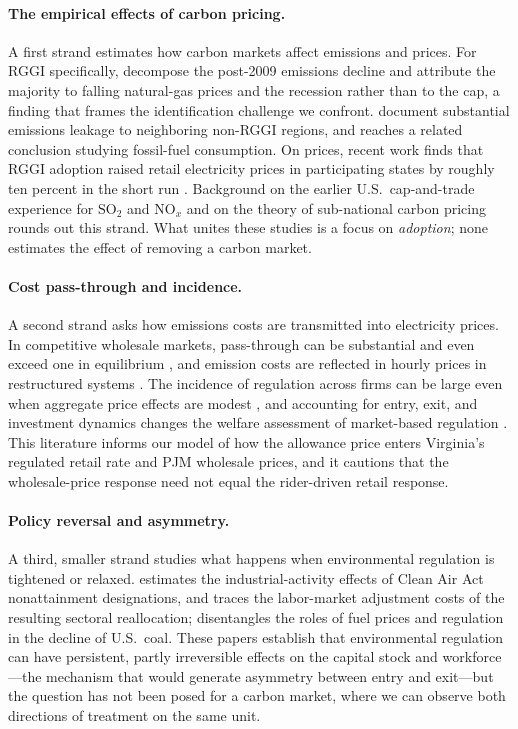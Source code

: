 \documentclass[12pt]{article}
\begin{document}
\paragraph{The empirical effects of carbon pricing.} A first strand estimates how carbon
markets affect emissions and prices. For RGGI specifically, \citet{Murray2015_rggi_attribution}
decompose the post-2009 emissions decline and attribute the majority to falling natural-gas
prices and the recession rather than to the cap, a finding that frames the identification
challenge we confront. \citet{Fell2018_leakage} document substantial emissions leakage to
neighboring non-RGGI regions, and \citet{Yan2021_rggi} reaches a related conclusion studying
fossil-fuel consumption. On prices, recent work finds that RGGI adoption raised retail
electricity prices in participating states by roughly ten percent in the short run
\citep{SongHochman2025_retail}. Background on the earlier U.S.\ cap-and-trade experience for
$\mathrm{SO}_2$ and $\mathrm{NO}_x$ \citep{Burtraw2009_so2nox} and on the theory of
sub-national carbon pricing \citep{Shobe2012_federalism} rounds out this strand. What unites
these studies is a focus on \emph{adoption}; none estimates the effect of removing a carbon market.

\paragraph{Cost pass-through and incidence.} A second strand asks how emissions costs are
transmitted into electricity prices. In competitive wholesale markets, pass-through can be
substantial and even exceed one in equilibrium \citep{Fabra2014_passthrough}, and emission
costs are reflected in hourly prices in restructured systems
\citep{Hintermann2016_passthrough}. The incidence of regulation across firms can be large
even when aggregate price effects are modest \citep{Bushnell2013_profiting}, and accounting
for entry, exit, and investment dynamics changes the welfare assessment of market-based
regulation \citep{Fowlie2016_dynamics}. This literature informs our model of how the
allowance price enters Virginia's regulated retail rate and PJM wholesale prices, and it
cautions that the wholesale-price response need not equal the rider-driven retail response.

\paragraph{Policy reversal and asymmetry.} A third, smaller strand studies what happens when
environmental regulation is tightened or relaxed. \citet{Greenstone2002_caa} estimates the
industrial-activity effects of Clean Air Act nonattainment designations, and
\citet{Walker2013_reallocation} traces the labor-market adjustment costs of the resulting
sectoral reallocation; \citet{Coglianese2020_coal} disentangles the roles of fuel prices and
regulation in the decline of U.S.\ coal. These papers establish that environmental regulation
can have persistent, partly irreversible effects on the capital stock and workforce---the
mechanism that would generate asymmetry between entry and exit---but the question has not been
posed for a carbon market, where we can observe both directions of treatment on the same unit.
\end{document}
